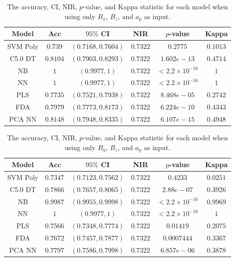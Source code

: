 \documentclass[sn-mathphys-num]{sn-jnl}%
\begin{document}
\begin{table}[!ht]
    \centering
    \caption{The accuracy, CI, NIR, $p$-value, and Kappa statistic for each model when using only $B_{x}$, $B_{z}$, and $a_{p}$ as input.}
	\label{tab:stats:reverse:xzap}
	\begin{tabular}{|c|c|c|c|c|c|}
		\hline
		Model & Acc & $95\%$ CI & NIR & $p$-value & Kappa \\ \hline
		SVM Poly & $0.739$ & $(0.7168, 0.7604)$ & $0.7322$ & $0.2775$ & $0.1013$ \\ \hline
		C5.0 DT & $0.8104$ & $(0.7903, 0.8293)$ & $0.7322$ & $1.602e-13$ & $0.4714$ \\ \hline
		NB & $1$ & $(0.9977, 1)$ & $0.7322$ & $< 2.2 \times {10}^{-16}$ & $1$ \\ \hline
		NN & $1$ & $(0.9977, 1)$ & $0.7322$ & $< 2.2 \times {10}^{-16}$ & $1$ \\ \hline
		PLS & $0.7735$ & $(0.7521, 0.7938)$ & $0.7322$ & $8.468e-05$ & $0.2742$ \\ \hline
		FDA & $0.7979$ & $(0.7773, 0.8173)$ & $0.7322$ & $6.224e-10$ & $0.4343$ \\ \hline
		PCA NN & $0.8148$ & $(0.7948, 0.8335)$ & $0.7322$ & $6.107e-15$ & $0.4948$ \\ \hline
	\end{tabular}
\end{table}

\begin{table}[!ht]
    \centering
    \caption{The accuracy, CI, NIR, $p$-value, and Kappa statistic for each model when using only $B_{y}$, $B_{z}$, and $a_{p}$ as input.}
	\label{tab:stats:reverse:yzap}
	\begin{tabular}{|c|c|c|c|c|c|}
		\hline
		Model & Acc & $95\%$ CI & NIR & $p$-value & Kappa \\ \hline
		SVM Poly & $0.7347$ & $(0.7123, 0.7562)$ & $0.7322$ & $0.4233$ & $0.0251$ \\ \hline
		C5.0 DT & $0.7866$ & $(0.7657, 0.8065)$ & $0.7322$ & $2.88e-07$ & $0.3926$ \\ \hline
		NB & $0.9987$ & $(0.9955, 0.9998)$ & $0.7322$ & $< 2.2 \times {10}^{-16}$ & $0.9969$ \\ \hline
		NN & $1$ & $(0.9977, 1)$ & $0.7322$ & $< 2.2 \times {10}^{-16}$ & $1$ \\ \hline
		PLS & $0.7566$ & $(0.7348, 0.7774)$ & $0.7322$ & $0.01419$ & $0.2075$ \\ \hline
		FDA & $0.7672$ & $(0.7457, 0.7877)$ & $0.7322$ & $0.0007444$ & $0.3367$ \\ \hline
		PCA NN & $0.7797$ & $(0.7586, 0.7998)$ & $0.7322$ & $6.857e-06$ & $0.3878$ \\ \hline
	\end{tabular}
\end{table}
\end{document}
